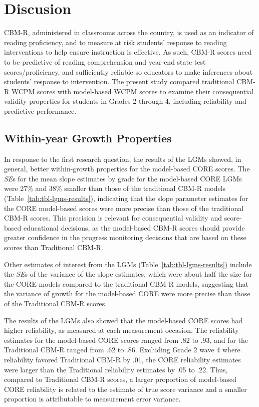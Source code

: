 \documentclass[
  english,
  man, fleqn, noextraspace]{apa6}
\begin{document}
\hypertarget{discusion}{%
\section{Discusion}\label{discusion}}

CBM-R, administered in classrooms across the country, is used as an indicator of reading proficiency, and to measure at risk students' response to reading interventions to help ensure instruction is effective. As such, CBM-R scores need to be predictive of reading comprehension and year-end state test scores/proficiency, and sufficiently reliable so educators to make inferences about students' response to intervention. The present study compared traditional CBM-R WCPM scores with model-based WCPM scores to examine their consequential validity properties for students in Grades 2 through 4, including reliability and predictive performance.

\hypertarget{within-year-growth-properties}{%
\subsection{Within-year Growth Properties}\label{within-year-growth-properties}}

In response to the first research question, the results of the LGMs showed, in general, better within-growth properties for the model-based CORE scores. The \emph{SE}s for the mean slope estimates by grade for the model-based CORE LGMs were 27\% and 38\% smaller than those of the traditional CBM-R models (Table~\ref{tab:tbl-lgms-results}), indicating that the slope parameter estimates for the CORE model-based scores were more precise than those of the traditional CBM-R scores. This precision is relevant for consequential validity and score-based educational decisions, as the model-based CBM-R scores should provide greater confidence in the progress monitoring decisions that are based on these scores than Traditional CBM-R.

Other estimates of interest from the LGMs (Table~\ref{tab:tbl-lgms-results}) include the \emph{SE}s of the variance of the slope estimates, which were about half the size for the CORE models compared to the traditional CBM-R models, suggesting that the variance of growth for the model-based CORE were more precise than those of the Traditional CBM-R scores.

The results of the LGMs also showed that the model-based CORE scores had higher reliability, as measured at each measurement occasion. The reliability estimates for the model-based CORE scores ranged from .82 to .93, and for the Traditional CBM-R ranged from .62 to .86. Excluding Grade 2 wave 4 where reliability favored Traditional CBM-R by .01, the CORE reliability estimates were larger than the Traditional reliability estimates by .05 to .22. Thus, compared to Traditional CBM-R scores, a larger proportion of model-based CORE reliability is related to the estimate of true score variance and a smaller proportion is attributable to measurement error variance.
\end{document}
